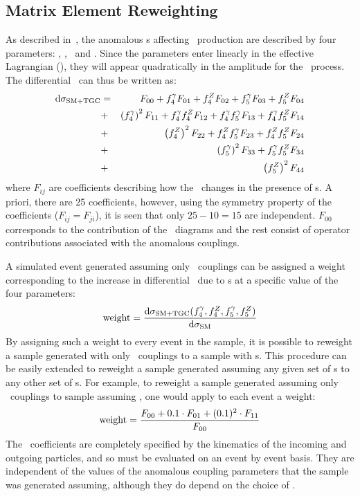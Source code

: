 \subsection{Matrix Element Reweighting}
\label{sec:TGC-reweighting}

As described in~, the anomalous \TGC s affecting \ZZ\
production are described by four parameters: \ffourg, \ffourZ, \ffiveg\ and
\ffiveZ.
Since the parameters enter linearly in the effective Lagrangian
(), they will appear
quadratically in the amplitude for the \ZZllll\ process. The differential \cx\
can thus be written as:
\begin{eqnarray}\label{eqn:dsigma}
{\rm d}\sigma_{\rm SM+TGC} & = & F_{00} + f_4^\gamma F_{01} + f_4^Z F_{02} + f_5^\gamma F_{03} + f_5^Z F_{04}  \nonumber \\
&+& \left(f_4^\gamma\right)^2F_{11} + f_4^\gamma f_4^Z F_{12} +  f_4^\gamma f_5^\gamma F_{13} + f_4^\gamma f_5^Z F_{14}  \nonumber \\
&+& \left(f_4^Z\right)^2F_{22} + f_4^Zf_5^\gamma F_{23} + f_4^Zf_5^Z F_{24}  \nonumber \\
&+& \left(f_5^\gamma\right)^2F_{33} + f_5^\gamma f_5^Z F_{34} \nonumber \\
&+& \left(f_5^Z\right)^2F_{44}
\end{eqnarray}
where $F_{ij}$ are coefficients describing how the \cx\ changes in the presence
of \TGC s. A priori, there are 25 coefficients, however, using the 
symmetry property of the coefficients ($F_{ij}=F_{ji}$), it is seen 
that only $25-10=15$ are independent. $F_{00}$ corresponds to the contribution
of the \sm\ diagrams and the rest consist of operator contributions associated with the
anomalous couplings. 

A simulated event generated assuming only \sm\ couplings can be assigned a
weight corresponding to the increase in differential \cx\
due to \TGC s at a specific value of the four parameters:
\begin{equation}
{\rm weight} = \frac{{\rm d}\sigma_{\rm SM+TGC}(f_{4}^{\gamma}, f_{4}^{Z}, f_{5}^{\gamma},
f_{5}^{Z})}{{\rm d}\sigma_{\rm SM}}
\end{equation}
By assigning such a weight to every event in the sample, it is possible to reweight a sample
generated with only \sm\ couplings to a sample with \TGC s.
This procedure can be easily extended to reweight a sample generated assuming
any given set of \TGC s to any other set of \TGC s. For example, to reweight a sample
generated assuming only \sm\ couplings to sample assuming , one would
apply to each event a weight:
\begin{eqnarray}\label{revisit}
{\rm weight} = \frac{F_{00} + 0.1 \cdot  F_{01} + (0.1)^{2} \cdot
F_{11}}{F_{00}}
\end{eqnarray}
The \Fij\ coefficients are completely specified by the kinematics of the
incoming and outgoing particles, and so must be evaluated on an event by event
basis. They are independent of the values of the anomalous coupling parameters
that the sample was generated assuming, although they do depend on the choice of
\formfactor. 

